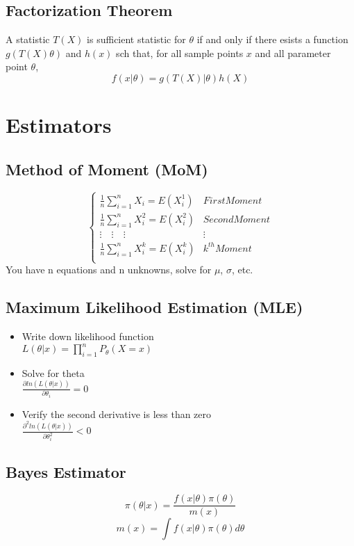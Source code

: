 \documentclass[12pt]{article}
\begin{document}
\subsection*{Factorization Theorem \cite[p. 4]{classnotes.15}}
A statistic $T(X)$ is sufficient statistic for $\theta$ if and only if there esists a function $g(T(X)\theta)$ and $h(x)$ sch that, for all sample points $x$ and all parameter point $\theta$, 
$$f(x|\theta)=g(T(X)|\theta)h(X)$$

\section*{Estimators}

\subsection*{Method of Moment (MoM)}
$$\begin{cases}
\frac{1}{n}\sum\limits_{i=1}^{n}X_i = E(X^1_i) & First Moment \\
\frac{1}{n}\sum\limits_{i=1}^{n}X_i^2 = E(X^2_i) & Second Moment \\
\vdots \quad \vdots \quad \vdots & \vdots \\
\frac{1}{n}\sum\limits_{i=1}^{n}X_i^k = E(X^k_i) & k^{th} Moment \\
\end{cases}$$
You have n equations and n unknowns, solve for $\mu$, $\sigma$, etc.
\subsection*{Maximum Likelihood Estimation (MLE)}
\begin{itemize}
\item Write down likelihood function \\ $L(\theta|x)=\prod\limits_{i=1}^{n}P_{\theta}(X=x)$
\item Solve for theta\\ $\frac{\partial ln(L(\theta|x))}{\partial \theta_i}=0$
\item Verify the second derivative is less than zero\\ $\frac{\partial^2 ln(L(\theta|x))}{\partial \theta_i^2}<0$
\end{itemize}

\subsection*{Bayes Estimator}
$$\pi(\theta|x)=\frac{f(x|\theta)\pi(\theta)}{m(x)}$$
$$m(x)=\int f(x|\theta)\pi(\theta)d\theta$$
\end{document}
